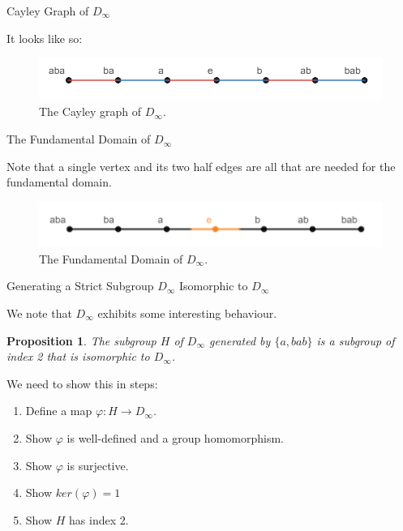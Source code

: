 \documentclass[usenames,dvipsnames]{beamer}
\newtheorem{proposition}{Proposition}
\begin{document}
\begin{frame}{Cayley Graph of $D_\infty$}

It looks like so:

\begin{figure}[h]
    \centering
    \includegraphics[width=1\textwidth]{images/2-01-Cayley_Graph.png}
    \caption{The Cayley graph of $D_\infty$.}
\end{figure}

\end{frame}

\begin{frame}{The Fundamental Domain of $D_\infty$}

Note that a single vertex and its two half edges are all that are needed for the fundamental domain.
\begin{figure}[h]
    \centering
    \includegraphics[width=1\textwidth]{images/2-01-01-Fundamental_Domain.png}
    \caption{The Fundamental Domain of $D_\infty$.}
\end{figure}

\end{frame}

\begin{frame}{Generating a Strict Subgroup $D_\infty$ Isomorphic to $D_\infty$}

We note that $D_\infty$ exhibits some interesting behaviour.

\begin{proposition}

The subgroup $H$ of $D_\infty$ generated by $\{a,bab\}$ is a subgroup of index 2 that is isomorphic to
$D_\infty$.

\end{proposition}

We need to show this in steps:

\begin{enumerate}
  \item Define a map $\varphi:H\rightarrow D_{\infty}$. 
  \item Show $\varphi$ is well-defined and a group homomorphism.
  \item Show $\varphi$ is surjective.
  \item Show $ker(\varphi)={1}$
  \item Show $H$ has index 2.
\end{enumerate}

\end{frame}
\end{document}
